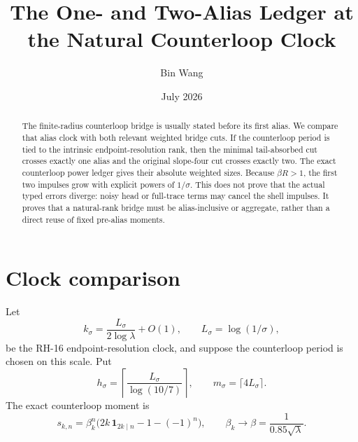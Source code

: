 \documentclass[11pt]{article}
\title{The One- and Two-Alias Ledger at the Natural Counterloop Clock}
\author{Bin Wang}\date{July 2026}
\theoremstyle{remark}\newtheorem{remark}[theorem]{Remark}
\begin{document}
\maketitle
\begin{abstract}
The finite-radius counterloop bridge is usually stated before its first
alias.  We compare that alias clock with both relevant weighted bridge cuts.
If the counterloop period is tied to the intrinsic endpoint-resolution rank,
then the minimal tail-absorbed cut crosses exactly one alias and the original
slope-four cut crosses exactly two.  The exact counterloop power ledger gives
their absolute weighted sizes.  Because $\beta R>1$, the first two impulses
grow with explicit powers of $1/\sigma$.  This does not prove that the actual
typed errors diverge: noisy head or full-trace terms may cancel the shell
impulses.  It proves that a natural-rank bridge must be alias-inclusive or
aggregate, rather than a direct reuse of fixed pre-alias moments.
\end{abstract}

\section{Clock comparison}
Let
\[
 k_\sigma=\frac{L_\sigma}{2\log\lambda}+O(1),\qquad
 L_\sigma=\log(1/\sigma),
\]
be the RH-16 endpoint-resolution clock, and suppose the counterloop period is
chosen on this scale.  Put
\[
 h_\sigma=\left\lceil\frac{L_\sigma}{\log(10/7)}\right\rceil,\qquad
 m_\sigma=\lceil4L_\sigma\rceil.
\]
The exact counterloop moment is
\[
 s_{k,n}=\beta_k^n
 \bigl(2k\,\mathbf1_{2k\mid n}-1-(-1)^n\bigr),
\qquad
 \beta_k\to\beta=\frac1{0.85\sqrt\lambda}.
\]
\end{document}
